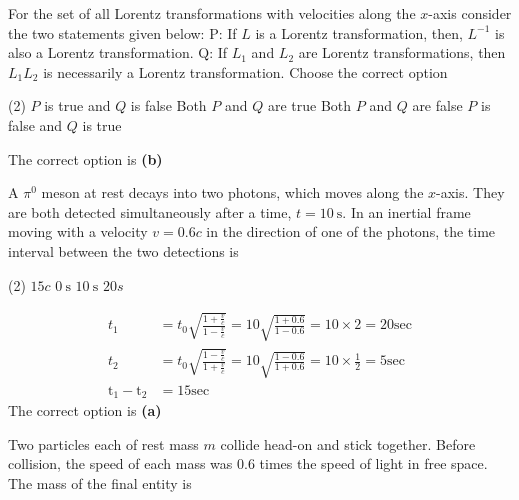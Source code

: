 \begin{enumerate}
\begin{minipage}{\textwidth}
	\item For the set of all Lorentz transformations with velocities along the $x$-axis consider the two statements given below:
	P: If $L$ is a Lorentz transformation, then, $L^{-1}$ is also a Lorentz transformation.
	Q: If $L_{1}$ and $L_{2}$ are Lorentz transformations, then $L_{1} L_{2}$ is necessarily a Lorentz transformation.
	Choose the correct option
\end{minipage}
\begin{tasks}(2)
	\task[\textbf{A.}] $P$ is true and $Q$ is false
	\task[\textbf{B.}]Both $P$ and $Q$ are true
	\task[\textbf{C.}]Both $P$ and $Q$ are false
	\task[\textbf{D.}]$P$ is false and $Q$ is true
\end{tasks}
\begin{answer}
The correct option is \textbf{(b)}
\end{answer}
\begin{minipage}{\textwidth}
	\item A $\pi^{0}$ meson at rest decays into two photons, which moves along the $x$-axis. They are both detected simultaneously after a time, $t=10 \mathrm{~s} .$ In an inertial frame moving with a velocity $v=0.6 c$ in the direction of one of the photons, the time interval between the two detections is
\end{minipage}
\begin{tasks}(2)
	\task[\textbf{A.}] $15 c$
	\task[\textbf{B.}]$0 \mathrm{~s}$
	\task[\textbf{C.}] $10 \mathrm{~s}$
	\task[\textbf{D.}]$20 s$
\end{tasks}
\begin{answer}
\begin{align*}
t_{1}&=t_{0} \sqrt{\frac{1+\frac{v}{c}}{1-\frac{v}{c}}}=10 \sqrt{\frac{1+0.6}{1-0.6}}=10 \times 2=20 \mathrm{sec}\\
t_{2}&=t_{0} \sqrt{\frac{1-\frac{v}{c}}{1+\frac{v}{c}}}=10 \sqrt{\frac{1-0.6}{1+0.6}}=10 \times \frac{1}{2}=5 \mathrm{sec}\\
\mathrm{t}_{1}-\mathrm{t}_{2}&=15 \mathrm{sec}
\end{align*}	
The correct option is \textbf{(a)}
\end{answer}
\begin{minipage}{\textwidth}
	\item Two particles each of rest mass $m$ collide head-on and stick together. Before collision, the speed of each mass was $0.6$ times the speed of light in free space. The mass of the final entity is

\end{minipage}
\end{enumerate}
